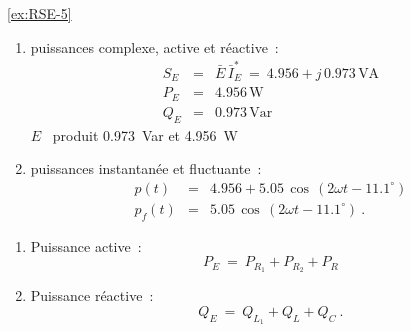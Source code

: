\begin{solexercise}{\ref{ex:RSE-5}}
\begin{enumerate}
	\item puissances complexe, active et réactive~:
	\begin{eqnarray*}
		S_E &=& \bar{E} \, \bar{I}_E^{\ast} \: = \ 4.956 + j\, 0.973 \, \text{VA}\\
		P_E &=& 4.956 \, \text{W}\\
		Q_E &=& 0.973 \, \text{Var}
	\end{eqnarray*}
	$E$ \, produit 0.973$\,$ Var et 4.956$\,$ W
	\item puissances instantanée et fluctuante~:
	\begin{eqnarray*}
		p(t) &=& 4.956 + 5.05\, \cos \, (2\omega t - 11.1^{\circ})\\
		p_f(t) &=& 5.05 \, \cos \, (2\omega t - 11.1^{\circ})~.
	\end{eqnarray*}
\end{enumerate}
\begin{enumerate}
	\item Puissance active~:
	\[ P_E \: = \: P_{R_1} + P_{R_2} + P_R \]
	\item Puissance réactive~:
	\[ Q_E \: = \: Q_{L_1} + Q_L + Q_C~. \]
\end{enumerate}

\end{solexercise}
